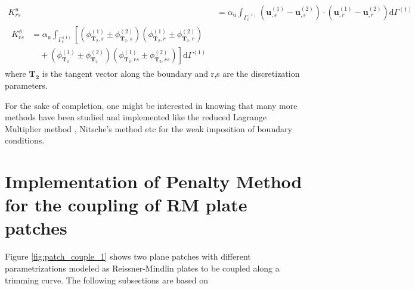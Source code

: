 \documentclass[12pt, a4paper]{report}
\begin{document}
\begin{align}\label{eq:coupling_stiff_1}
    K_{r s}^{u} &= \alpha_{\mathrm{u}} \int_{\Gamma_{\mathrm{c}}^{(1)}}\left(\mathbf{u}_{, s}^{(1)}-\mathbf{u}_{, s}^{(2)}\right) \cdot\left(\mathbf{u}_{, r}^{(1)}-\mathbf{u}_{, r}^{(2)}\right) \mathrm{d} \Gamma_{\mathrm{}}^{(1)} \\
    \begin{split}\label{eq:coupling_stiff_2}
    K_{r s}^{\phi} &= \alpha_{\mathrm{u}} \int_{\Gamma_{\mathrm{c}}^{(1)}}\left[\left(\phi_{\mathbf{T}_2, s}^{(1)} \pm \phi_{\mathbf{T}_2, s}^{(2)}\right)\left(\phi_{\mathbf{T}_2, r}^{(1)} \pm \phi_{\mathbf{T}_2, r}^{(2)}\right) \right. \\
    &\quad + \left. \left(\phi_{\mathbf{T}_2}^{(1)} \pm \phi_{\mathbf{T}_2}^{(2)}\right)\left(\phi_{\mathbf{T}_2, r s}^{(1)} \pm \phi_{\mathbf{T}_2, r s}^{(2)}\right)\right] \mathrm{d} \Gamma_{\mathrm{}}^{(1)}
    \end{split}
\end{align}
where $\mathbf{T_2}$ is the tangent vector along the boundary and r,s are the discretization parameters.\par
For the sake of completion, one might be interested in knowing that many more methods have been studied and implemented like the reduced Lagrange Multiplier method \cite{Reduced_LM}, Nitsche's method \cite {Nitsch_DBC} etc for the weak imposition of boundary conditions.

\section{Implementation of Penalty Method for the coupling of RM plate patches}
Figure \ref{fig:patch_couple_1} shows two plane patches with different parametrizations modeled as Reissner-Mindlin plates to be coupled along a trimming curve. The following subsections are based on \cite{jos_kind_shell_penalty}
\end{document}
